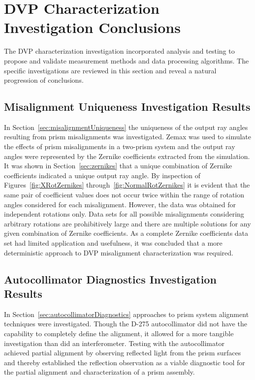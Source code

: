 \section{DVP Characterization Investigation Conclusions}

The \ac{DVP} characterization investigation incorporated analysis and testing to propose and validate measurement methods and data processing algorithms. The specific investigations are reviewed in this section and reveal a natural progression of conclusions.

\subsection{Misalignment Uniqueness Investigation Results}
In Section~\ref{sec:misalignmentUniqueness} the uniqueness of the output ray angles resulting from prism misalignments was investigated. Zemax was used to simulate the effects of prism misalignments in a two-prism system and the output ray angles were represented by the Zernike coefficients extracted from the simulation. It was shown in Section~\ref{sec:zernikes} that a unique combination of Zernike coefficients indicated a unique output ray angle. By inspection of Figures~\ref{fig:XRotZernikes} through~\ref{fig:NormalRotZernikes} it is evident that the same pair of coefficient values does not occur twice within the range of rotation angles considered for each misalignment. However, the data was obtained for independent rotations only. Data sets for all possible misalignments considering arbitrary rotations are prohibitively large and there are multiple solutions for any given combination of Zernike coefficients. As a complete Zernike coefficients data set had limited application and usefulness, it was concluded that a more deterministic approach to \ac{DVP} misalignment characterization was required.

\subsection{Autocollimator Diagnostics Investigation Results}
In Section~\ref{sec:autocollimatorDiagnostics} approaches to prism system alignment techniques were investigated. Though the D-275 autocollimator did not have the capability to completely define the alignment, it allowed for a more tangible investigation than did an interferometer. Testing with the autocollimator achieved partial alignment by observing reflected light from the prism surfaces and thereby established the reflection observation as a viable diagnostic tool for the partial alignment and characterization of a prism assembly.

